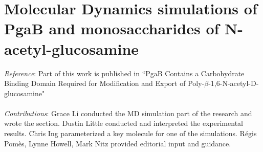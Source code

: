 % 


\chapter[MD simulations of PgaB-glucosamine binding]{Molecular Dynamics simulations of PgaB and monosaccharides of N-acetyl-glucosamine}

\emph{Reference}: Part of this work is published in ``PgaB Contains a Carbohydrate Binding Domain Required for Modification and Export of Poly-$\beta$-1,6-N-acetyl-D-glucosamine"
\\
\\
\emph{Contributions}:
Grace Li conducted the MD simulation part of the research and wrote the section. Dustin Little conducted and interpreted the experimental results. Chris Ing parameterized a key molecule for one of the simulations. Régis Pomès, Lynne Howell, Mark Nitz provided editorial input and guidance.

\newpage

